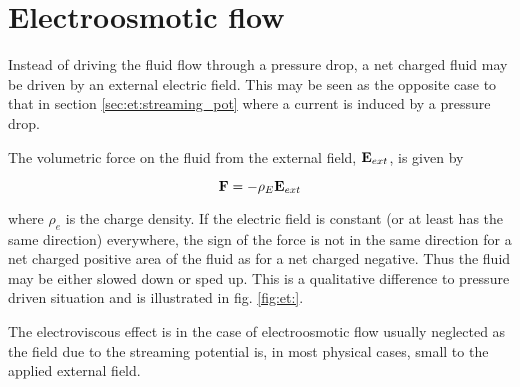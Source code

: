 \section{Electroosmotic flow}\label{sec:et:electroosmosis}
Instead of driving the fluid flow through a pressure drop, a net
charged fluid may be driven by an external electric field. This may
be seen as the opposite case to that in section
\ref{sec:et:streaming_pot} where a current is induced by a pressure
drop.

The volumetric force on the fluid from the external field, $\mathbf{E}_{ext}$,
is given by

\begin{equation}
\mathbf{F} = - \mathrm{\rho}_E \mathbf{E}_{ext}
\end{equation}

where $\rho_e$ is the charge density. If the electric field is
constant (or at least has the same direction) everywhere, the sign of
the force is not in the same direction for a net charged positive area
of the fluid as for a net charged negative. Thus the fluid may be
either slowed down or sped up. This is a qualitative difference to
pressure driven situation and is illustrated in fig. \ref{fig:et:}.

The electroviscous effect is in the case of electroosmotic flow
usually neglected as the field due to the streaming potential is, in
most physical cases, small to the applied external
field. \cite{dongquing-ren} 


